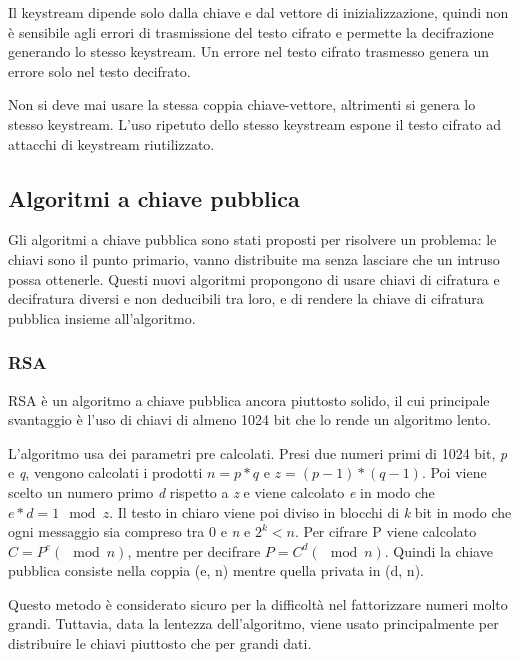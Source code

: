 Il keystream dipende solo dalla chiave e dal vettore di inizializzazione, quindi non è sensibile agli errori di trasmissione del testo cifrato e permette la decifrazione generando lo stesso keystream. Un errore nel testo cifrato trasmesso genera un errore solo nel testo decifrato.

Non si deve mai usare la stessa coppia chiave-vettore, altrimenti si genera lo stesso keystream.
L'uso ripetuto dello stesso keystream espone il testo cifrato ad attacchi di keystream riutilizzato.

\subsection{Algoritmi a chiave pubblica} %
Gli algoritmi a chiave pubblica sono stati proposti per risolvere un problema: le chiavi sono il punto primario, vanno distribuite ma senza lasciare che un intruso possa ottenerle.
Questi nuovi algoritmi propongono di usare chiavi di cifratura e decifratura diversi e non deducibili tra loro, e di rendere la chiave di cifratura pubblica insieme all'algoritmo.

\subsubsection{RSA}
RSA è un algoritmo a chiave pubblica ancora piuttosto solido, il cui principale svantaggio è l'uso di chiavi di almeno 1024 bit che lo rende un algoritmo lento.

L'algoritmo usa dei parametri pre calcolati.
Presi due numeri primi di 1024 bit, \textit{p} e \textit{q}, vengono calcolati i prodotti $n=p*q$ e $z=(p-1)*(q-1)$. 
Poi viene scelto un numero primo \textit{d} rispetto a \textit{z} e viene calcolato \textit{e} in modo che $e*d=1 \mod z$.
Il testo in chiaro viene poi diviso in blocchi di \textit{k} bit in modo che ogni messaggio sia compreso tra 0 e \textit{n} e $2^k < n$.
Per cifrare P viene calcolato $C=P^e(\mod n)$, mentre per decifrare $P=C^d (\mod n)$.
Quindi la chiave pubblica consiste nella coppia (e, n) mentre quella privata in (d, n).

Questo metodo è considerato sicuro per la difficoltà nel fattorizzare numeri molto grandi.
Tuttavia, data la lentezza dell'algoritmo, viene usato principalmente per distribuire le chiavi piuttosto che per grandi dati.

